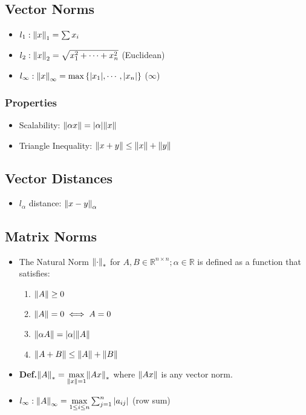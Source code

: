 \documentclass[8pt, letterpaper]{extarticle}
\newcommand{\defn}{\textbf{Def.}\xspace}
\begin{document}
\begin{multicols*}{3}
  \subsection{Vector Norms}
  \begin{itemize}
    \item $l_1 : \norm{x}_1 = \sum x_i$
    \item $l_2 : \norm{x}_2 = \sqrt{x_1^2 + \dotsb + x_n^2}$ (Euclidean)
    \item $l_\infty : \norm{x}_\infty = \max{\{|x_1|, \dotsb, |x_n|\}}$
      ($\infty$) 
  \end{itemize}

  \subsubsection{Properties}
  \begin{itemize}
    \item Scalability: $\norm{\alpha x} = \abs{\alpha} \norm{x}$
    \item Triangle Inequality: $\norm{x+y} \leq \norm{x} + \norm{y}$
  \end{itemize}

  \subsection{Vector Distances}
  \begin{itemize}
    \item $l_\alpha$ distance: $\norm{x-y}_\alpha$
  \end{itemize}

  \subsection{Matrix Norms}
  \begin{itemize}
    \item The Natural Norm $\norm{\cdot}_*$ for $A, B \in \mathbb{R}^{n \times n};
      \alpha \in \mathbb{R}$ is defined as a function that satisfies:
      \begin{enumerate}
        \item $\norm{A} \geq 0$
        \item $\norm{A} = 0 \iff A = 0$
        \item $\norm{\alpha A} = \abs{\alpha} \norm{A}$
        \item $\norm{A + B} \leq \norm{A} + \norm{B}$
      \end{enumerate}
    \item \defn $\norm{A}_* = \underset{\|x\| = 1}{\max} \norm{Ax}_*$ where
      $\norm{Ax}$ is any vector norm.
    \item $l_\infty : \norm{A}_\infty = \underset{1 \leq i \leq n}{\max}
      \sum_{j=1}^{n} \abs{a_{ij}}$ (row sum)
  \end{itemize}

\end{multicols*}
\end{document}
